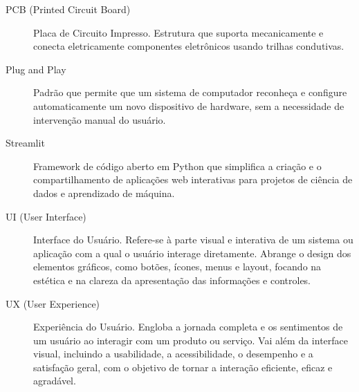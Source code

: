 \begin{description}
    \item[PCB (Printed Circuit Board)] Placa de Circuito Impresso. Estrutura que suporta mecanicamente e conecta eletricamente componentes eletrônicos usando trilhas condutivas.
    \item[Plug and Play] Padrão que permite que um sistema de computador reconheça e configure automaticamente um novo dispositivo de hardware, sem a necessidade de intervenção manual do usuário.
    \item[Streamlit] Framework de código aberto em Python que simplifica a criação e o compartilhamento de aplicações web interativas para projetos de ciência de dados e aprendizado de máquina.
    \item[UI (User Interface)] Interface do Usuário. Refere-se à parte visual e interativa de um sistema ou aplicação com a qual o usuário interage diretamente. Abrange o design dos elementos gráficos, como botões, ícones, menus e layout, focando na estética e na clareza da apresentação das informações e controles.
    \item[UX (User Experience)] Experiência do Usuário. Engloba a jornada completa e os sentimentos de um usuário ao interagir com um produto ou serviço. Vai além da interface visual, incluindo a usabilidade, a acessibilidade, o desempenho e a satisfação geral, com o objetivo de tornar a interação eficiente, eficaz e agradável.
\end{description}
